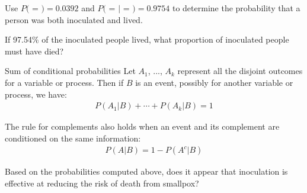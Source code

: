 \begin{exercisewrap}
\begin{nexercise}
Use $P($ = $) = 0.0392$ and $P($ =  $|$  = $) = 0.9754$ to determine the probability that a person was both inoculated and lived.\footnotemark
\end{nexercise}
\end{exercisewrap}


\begin{exercisewrap}
\begin{nexercise}
If 97.54\% of the inoculated people lived,
what proportion of inoculated people must have died?\footnotemark{}
\end{nexercise}
\end{exercisewrap}

\begin{onebox}{Sum of conditional probabilities}
Let $A_1$, ..., $A_k$ represent all the disjoint outcomes for a variable or process. Then if $B$ is an event, possibly for another variable or process, we have: \vspace{-1mm}
\begin{align*}
P(A_1|B) + \cdots + P(A_k|B) = 1
\end{align*}%
\vspace{-5.5mm} \par
The rule for complements also holds when an event and its complement are conditioned on the same information: \vspace{-1.5mm}
\begin{align*}
P(A | B) = 1 - P(A^c | B)
\end{align*}
\end{onebox}

\begin{exercisewrap}
\begin{nexercise}
Based on the probabilities computed above, does it appear that inoculation is effective at reducing the risk of death from smallpox?\footnotemark
\end{nexercise}
\end{exercisewrap}


